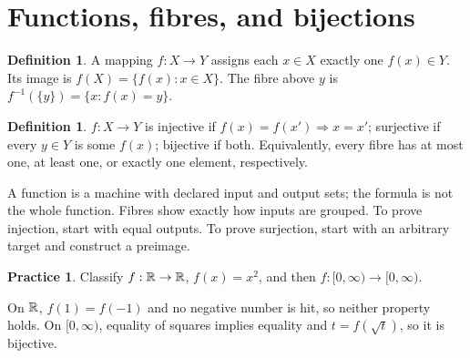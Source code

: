 \documentclass[11pt,openany]{book}
\theoremstyle{definition}
\newtheorem{definition}[theorem]{Definition}
\newtheorem{exercise}[theorem]{Practice}
\begin{document}
\section{Functions, fibres, and bijections}
\begin{definition}
A mapping $f:X\to Y$ assigns each $x\in X$ exactly one $f(x)\in Y$. Its image is $f(X)=\{f(x):x\in X\}$. The fibre above $y$ is $f^{-1}(\{y\})=\{x:f(x)=y\}$.
\end{definition}
\begin{definition}
$f:X\to Y$ is injective if $f(x)=f(x')\Rightarrow x=x'$; surjective if every $y\in Y$ is some $f(x)$; bijective if both. Equivalently, every fibre has at most one, at least one, or exactly one element, respectively.
\end{definition}
\begin{intuition}
A function is a machine with declared input and output sets; the formula is not the whole function. Fibres show exactly how inputs are grouped. To prove injection, start with equal outputs. To prove surjection, start with an arbitrary target and construct a preimage.
\end{intuition}
\begin{exercise}Classify $f:\mathbb R\to\mathbb R$, $f(x)=x^2$, and then $f:[0,\infty)\to[0,\infty)$.\end{exercise}
\begin{solution}On $\mathbb R$, $f(1)=f(-1)$ and no negative number is hit, so neither property holds. On $[0,\infty)$, equality of squares implies equality and $t=f(\sqrt t)$, so it is bijective.\end{solution}
\end{document}
